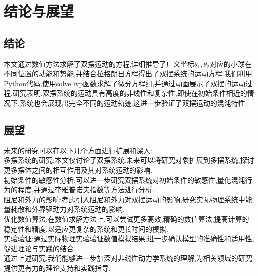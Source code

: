 \documentclass{report}
\begin{document}
\chapter{结论与展望}
\section{结论}
本文通过数值方法求解了双摆运动的方程,详细推导了广义坐标$\theta_1,\theta_2$对应的小球在不同位置的动能和势能,并结合拉格朗日方程得出了双摆系统的运动方程.我们利用Python代码,使用solve ivp函数求解了微分方程组,并通过动画展示了双摆的运动过程.研究表明,双摆系统的运动具有高度的非线性和复杂性,即使在初始条件相近的情况下,系统也会展现出完全不同的运动轨迹.这进一步验证了双摆运动的混沌特性.
\section{展望}
未来的研究可以在以下几个方面进行扩展和深入:\\
多摆系统的研究:本文仅讨论了双摆系统,未来可以将研究对象扩展到多摆系统,探讨更多摆体之间的相互作用及其对系统运动的影响.\\
初始条件的敏感性分析:可以进一步研究双摆系统对初始条件的敏感性,量化混沌行为的程度,并通过李雅普诺夫指数等方法进行分析.\\
阻尼和外力的影响:考虑引入阻尼和外力对双摆运动的影响,研究实际物理系统中能量耗散和外界驱动力对系统运动的影响.\\
优化数值算法:在数值求解方法上,可以尝试更多高效,精确的数值算法,提高计算的稳定性和精度,以适应更复杂的系统和更长时间的模拟.\\
实验验证:通过实际物理实验验证数值模拟结果,进一步确认模型的准确性和适用性,促进理论与实践的结合.\\
通过上述研究,我们能够进一步加深对非线性动力学系统的理解,为相关领域的研究提供更有力的理论支持和实践指导.
\end{document}
